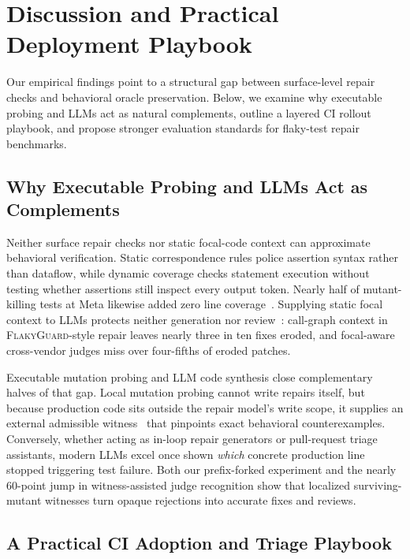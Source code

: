 \section{Discussion and Practical Deployment Playbook}
\label{sec:discussion}

Our empirical findings point to a structural gap between surface-level repair checks and behavioral oracle preservation. Below, we examine why executable probing and LLMs act as natural complements, outline a layered CI rollout playbook, and propose stronger evaluation standards for flaky-test repair benchmarks.

\subsection{Why Executable Probing and LLMs Act as Complements}

Neither surface repair checks nor static focal-code context can approximate behavioral verification. Static correspondence rules police assertion syntax rather than dataflow, while dynamic coverage checks statement execution without testing whether assertions still inspect every output token. Nearly half of mutant-killing tests at Meta likewise added zero line coverage~\cite{harman2025ach}. Supplying static focal context to LLMs protects neither generation nor review~\cite{chou2026aijudge}: call-graph context in \textsc{FlakyGuard}-style repair leaves nearly three in ten fixes eroded, and focal-aware cross-vendor judges miss over four-fifths of eroded patches.

Executable mutation probing and LLM code synthesis close complementary halves of that gap. Local mutation probing cannot write repairs itself, but because production code sits outside the repair model's write scope, it supplies an external admissible witness~\cite{mohammadi2026whoseoracle} that pinpoints exact behavioral counterexamples. Conversely, whether acting as in-loop repair generators or pull-request triage assistants, modern LLMs excel once shown \emph{which} concrete production line stopped triggering test failure. Both our prefix-forked experiment and the nearly 60-point jump in witness-assisted judge recognition show that localized surviving-mutant witnesses turn opaque rejections into accurate fixes and reviews.

\subsection{A Practical CI Adoption and Triage Playbook}

